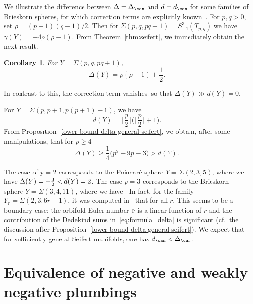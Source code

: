 \documentclass[pdftex]{sigma}
\newtheorem{Corollary}[Theorem]{Corollary}
\begin{document}
We illustrate the difference between $\Delta = \Delta_{\can}$ and $d = d_{\can}$ for some families of Brieskorn spheres, for which correction terms are explicitly known~\cite{BorNem2011}. For $p, q > 0$, set $\rho = (p-1)(q-1)/2$. Then for $\Sigma(p, q, p q+1)= S^3_{-1}(T_{p, q})$ we have
$\gamma(Y) = -4\rho(\rho-1)$. From Theorem~\ref{thm:seifert}, we immediately obtain the next result.

\begin{Corollary}
 For $Y = \Sigma(p, q, pq+1)$,
 \begin{equation*}%
 \Delta(Y) = \rho(\rho-1) + \frac{1}{2}.
 \end{equation*}
\end{Corollary}
In contrast to this, the correction term vanishes, so that $\Delta(Y) \gg d(Y) = 0$.

For $Y = \Sigma(p, p+1, p(p+1)-1)$, we have
\begin{equation*}%
d(Y) = \biggl\lfloor \frac{p}{2} \biggr\rfloor\biggl(\biggl\lfloor \frac{p}{2} \biggr\rfloor+1\biggr).
\end{equation*}
From Proposition~\ref{lower-bound-delta-general-seifert}, we obtain, after some manipulations, that for $p\geq 4$
\begin{equation*}%
 \Delta(Y) \geq \frac{1}{4}\bigl(p^3-9p- 3 \bigr) > d(Y).
\end{equation*}

The case of $p = 2$ corresponds to the Poincar\'e sphere $Y = \Sigma(2, 3, 5)$, where we have $\Delta(Y) = \smash{-\frac{3}{2}} < d(Y) = 2$. The case $p = 3$ corresponds to the Brieskorn sphere $Y = \Sigma(3, 4, 11)$, where we have . In fact, for the family $Y_r = \Sigma(2, 3, 6r-1)$, it was computed in~\cite{GPP21} that  for all $r$. This seems to be a boundary case: the orbifold Euler number ${\rm e}$ is a linear function of $r$ and the contribution of the Dedekind sums in~\eqref{eq:formula_delta} is significant (cf.~the discussion after Proposition~\ref{lower-bound-delta-general-seifert}). We expect that for sufficiently general Seifert manifolds, one has
$d_{\can} < \Delta_{\can}$.

\appendix

\section{Equivalence of negative and weakly negative plumbings}
\end{document}
